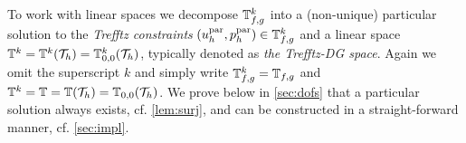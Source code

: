 \documentclass[pdflatex,sn-mathphys,Numbered]{sn-jnl}%
\theoremstyle{remark}%
\theoremstyle{definition}%
\begin{document}
To work with linear spaces we decompose $\mathbb{T}^k_{f,g}$ into a (non-unique) particular solution to the \emph{Trefftz constraints}
$(u_{h}^{\textrm{par}},p_{h}^{\textrm{par}}) \in \mathbb{T}^k_{f,g}$ and a linear space
$\mathbb{T}^k=\mathbb{T}^k({\mathcal{T}_h})=\mathbb{T}^k_{0,0}({\mathcal{T}_h})$, typically denoted as \emph{the
Trefftz-DG space}. Again we omit the superscript $k$ and simply write
$\mathbb{T}^k_{f,g} = \mathbb{T}_{f,g}$ and $\mathbb{T}^k=\mathbb{T}=\mathbb{T}({\mathcal{T}_h})=\mathbb{T}_{0,0}({\mathcal{T}_h})$.
We prove below in \cref{sec:dofs} that a particular solution always exists, cf. \cref{lem:surj}, and can be
constructed in a straight-forward manner, cf. \cref{sec:impl}.
\end{document}
